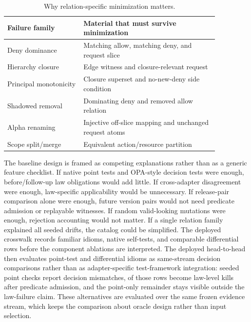 \documentclass[10pt,conference]{IEEEtran}
\begin{document}
\begin{table}[t]
\centering
\caption{Why relation-specific minimization matters.}
\label{tab:minimization}
\begin{tabular}{p{0.31\linewidth}p{0.55\linewidth}}
\toprule
Failure family & Material that must survive minimization \\
\midrule
Deny dominance & Matching allow, matching deny, and request slice \\
Hierarchy closure & Edge witness and closure-relevant request \\
Principal monotonicity & Closure superset and no-new-deny side condition \\
Shadowed removal & Dominating deny and removed allow relation \\
Alpha renaming & Injective off-slice mapping and unchanged request atoms \\
Scope split/merge & Equivalent action/resource partition \\
\bottomrule
\end{tabular}
\end{table}

The baseline design is framed as competing explanations rather than as a generic feature checklist.  If native point tests and OPA-style decision tests were enough, before/follow-up law obligations would add little.  If cross-adapter disagreement were enough, law-specific applicability would be unnecessary.  If release-pair comparison alone were enough, future version pairs would not need predicate admission or replayable witnesses.  If random valid-looking mutations were enough, rejection accounting would not matter.  If a single relation family explained all seeded drifts, the catalog could be simplified.  The deployed crosswalk records \LGDeployedCrosswalkRows{} familiar idioms, \LGDeployedNativeSelftests{} native self-tests, and \LGDeployedCrossAdapterRows{} comparable differential rows before the component ablations are interpreted.  The deployed head-to-head then evaluates point-test and differential idioms as same-stream decision comparisons rather than as adapter-specific test-framework integration: seeded point checks report \LGSeededPointMismatches{} decision mismatches, \LGSeededHeadToHeadOverlap{} of those rows become law-level kills after predicate admission, and the point-only remainder stays visible outside the law-failure claim.  These alternatives are evaluated over the same frozen evidence stream, which keeps the comparison about oracle design rather than input selection.
\end{document}
